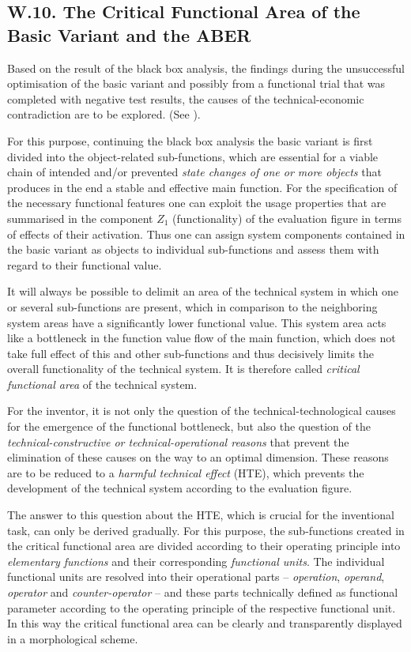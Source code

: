\documentclass[11pt,a4paper]{article}
\begin{document}
\subsection*{W.10. The Critical Functional Area of the Basic Variant and
  the ABER}

Based on the result of the black box analysis, the findings during the
unsuccessful optimisation of the basic variant and possibly from a functional
trial that was completed with negative test results, the causes of the
technical-economic contradiction are to be explored. (See \cite[A.5]{RM-21}).

For this purpose, continuing the black box analysis the basic variant is first
divided into the object-related sub-functions, which are essential for a
viable chain of intended and/or prevented \emph{state changes of one or more
  objects} that produces in the end a stable and effective main function.  For
the specification of the necessary functional features one can exploit the
usage properties that are summarised in the component $Z_1$ (functionality) of
the evaluation figure in terms of effects of their activation. Thus one can
assign system components contained in the basic variant as objects to
individual sub-functions and assess them with regard to their functional
value.

It will always be possible to delimit an area of the technical system in which
one or several sub-functions are present, which in comparison to the
neighboring system areas have a significantly lower functional value. This
system area acts like a bottleneck in the function value flow of the main
function, which does not take full effect of this and other sub-functions and
thus decisively limits the overall functionality of the technical system. It
is therefore called \emph{critical functional area} of the technical system.

For the inventor, it is not only the question of the technical-technological
causes for the emergence of the functional bottleneck, but also the question
of the \emph{technical-constructive or technical-operational reasons} that
prevent the elimination of these causes on the way to an optimal dimension.
These reasons are to be reduced to a \emph{harmful technical effect} (HTE),
which prevents the development of the technical system according to the
evaluation figure.

The answer to this question about the HTE, which is crucial for the
inventional task, can only be derived gradually. For this purpose, the
sub-functions created in the critical functional area are divided according to
their operating principle into \emph{elementary functions} and their
corresponding \emph{functional units}. The individual functional units are
resolved into their operational parts -- \emph{operation}, \emph{operand},
\emph{operator} and \emph{counter-operator} -- and these parts technically
defined as functional parameter according to the operating principle of the
respective functional unit. In this way the critical functional area can be
clearly and transparently displayed in a morphological scheme.
\end{document}
